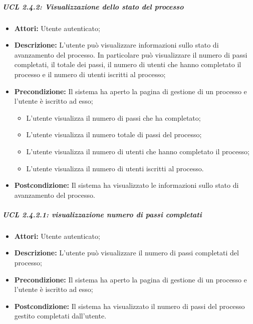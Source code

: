 \subparagraph{UCL 2.4.2: Visualizzazione dello stato del processo}
\begin{itemize}
\item \textbf{Attori:} Utente autenticato;
\item \textbf{Descrizione:} L'utente può visualizzare informazioni sullo stato di avanzamento del processo. In particolare può visualizzare il numero di passi completati, il totale dei passi, il numero di utenti che hanno completato il processo e il numero di utenti iscritti al processo;
\item \textbf{Precondizione:} Il sistema ha aperto la pagina di gestione di un processo e l'utente è iscritto ad esso;
\begin{itemize}
\item L'utente visualizza il numero di passi che ha completato;
\item L'utente visualizza il numero totale di passi del processo;
\item L'utente visualizza il numero di utenti che hanno completato il processo;
\item L'utente visualizza il numero di utenti iscritti al processo.
\end{itemize}
\item \textbf{Postcondizione:} Il sistema ha visualizzato le informazioni sullo stato di avanzamento del processo.
\end{itemize}

\subparagraph{UCL 2.4.2.1: visualizzazione numero di passi completati}
\begin{itemize}
\item \textbf{Attori:} Utente autenticato;
\item \textbf{Descrizione:} L'utente può visualizzare il numero di passi completati del processo;
\item \textbf{Precondizione:} Il sistema ha aperto la pagina di gestione di un processo e l'utente è iscritto ad esso;
\item \textbf{Postcondizione:} Il sistema ha visualizzato il numero di passi del processo gestito completati dall'utente.
\end{itemize}

